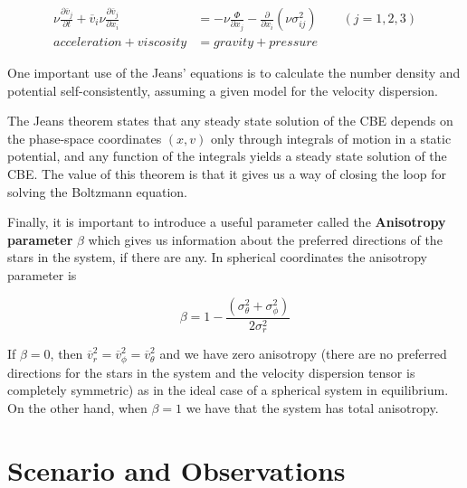 \begin{equation}
\begin{aligned}	
	\nu \frac{\partial \overline{v}_j}{\partial t} + \overline{v}_i\nu \frac{\partial\overline{v}_j}{\partial x_{i}} &= -\nu \frac{\Phi}{\partial x_{j}}-\frac{\partial}{\partial x_{i}}(\nu \sigma_{ij}^{2})\quad\quad (j=1,2,3) \\     acceleration + viscosity &= gravity + pressure
	\end{aligned}
\end{equation}

One important use of the Jeans' equations is to calculate the number density and potential self-consistently, assuming
a given model for the velocity dispersion.

The Jeans theorem states that any steady state solution of the CBE depends on the phase-space coordinates $(x,v)$ only through integrals of motion in a static potential, and any function of the integrals yields a steady state solution of the CBE. The value of this theorem is that it gives us a way of closing the loop for solving the Boltzmann equation. 

Finally, it is important to introduce a useful parameter called the \textbf{Anisotropy parameter} $\beta$ which gives us information about the preferred directions of the stars in the system, if there are any. In spherical coordinates the anisotropy parameter is

\begin{equation}
\beta=1-\frac{\left(\sigma_{\theta}^{2}+\sigma_{\phi}^{2}\right)}{2\sigma_{r}^{2}}
\end{equation}

If $\beta=0$, then $\overline{v}_{r}^{2}=\overline{v}_{\phi}^{2}=\overline{v}_{\theta}^{2}$ and we have zero anisotropy (there are no preferred directions for the stars in the system and the velocity dispersion tensor is completely symmetric) as in the ideal case of a spherical system in equilibrium. On the other hand, when $\beta=1$ we have that the system has total anisotropy.

\section{Scenario and Observations}

